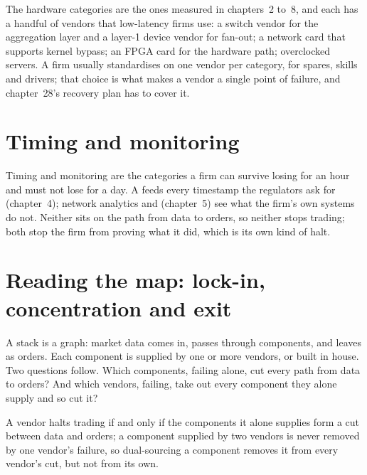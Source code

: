 The hardware categories are the ones measured in chapters~2 to~8, and each has a handful of vendors that low-latency firms use: a
switch vendor for the aggregation layer and a layer-1 device vendor for fan-out; a network card that supports kernel bypass; an
FPGA card for the hardware path; overclocked servers. A firm usually standardises on one vendor per category, for spares, skills
and drivers; that choice is what makes a vendor a single point of failure, and chapter~28's recovery plan has to cover it.

\section{Timing and monitoring}

Timing and monitoring are the categories a firm can survive losing for an hour and must not lose for a day. A 
feeds every timestamp the regulators ask for (chapter~4); network analytics and  (chapter~5) see what the firm's
own systems do not. Neither sits on the path from data to orders, so neither stops trading; both stop the firm from proving what it
did, which is its own kind of halt.

\section{Reading the map: lock-in, concentration and exit}

A stack is a graph: market data comes in, passes through components, and leaves as orders. Each component is supplied by one or
more vendors, or built in house. Two questions follow. Which components, failing alone, cut every path from data to orders? And
which vendors, failing, take out every component they alone supply and so cut it?

\label{lst:nw:the-vendor-map:graph}

\begin{proposition}\label{prop:nw:the-vendor-map:vendors}
A vendor halts trading if and only if the components it alone supplies form a cut between data and orders; a component supplied
by two vendors is never removed by one vendor's failure, so dual-sourcing a component removes it from every vendor's cut, but not
from its own.
\end{proposition}

